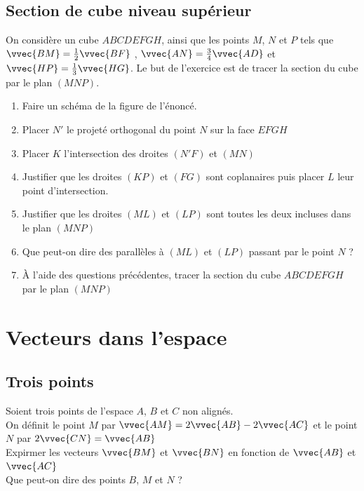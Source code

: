 \documentclass[oneside,12pt]{book}          %
\begin{document}
\subsection{Section de cube niveau supérieur}
On considère un cube $ABCDEFGH$, ainsi que les points $M$, $N$ et $P$ tels que $\vvec{BM}=\frac{1}{2}\vvec{BF}$ , $\vvec{AN}=\frac{3}{4}\vvec{AD}$ et $\vvec{HP}=\frac{1}{3}\vvec{HG}$. Le but de l'exercice est de tracer la section du cube par le plan $(MNP)$.
\begin{enumerate}
    \item Faire un schéma de la figure de l'énoncé.
    \item Placer $N'$ le projeté orthogonal du point $N$ sur la face $EFGH$
    \item Placer $K$ l'intersection des droites $(N'F)$ et $(MN)$
    \item Justifier que les droites $(KP)$ et $(FG)$ sont coplanaires puis placer $L$ leur point d'intersection.
    \item Justifier que les droites $(ML)$ et $(LP)$ sont toutes les deux incluses dans le plan $(MNP)$
    \item Que peut-on dire des parallèles à $(ML)$ et $(LP)$ passant par le point $N$ ?
    \item À l'aide des questions précédentes, tracer la section du cube $ABCDEFGH$ par le plan $(MNP)$
\end{enumerate}



\section{Vecteurs dans l'espace}

\subsection{Trois points}
Soient trois points de l'espace $A$, $B$ et $C$ non alignés.\\
On définit le point $M$ par $\vvec{AM}=2\vvec{AB}-2\vvec{AC}$ et le point $N$ par $2\vvec{CN}=\vvec{AB}$\\
Expirmer les vecteurs $\vvec{BM}$ et $\vvec{BN}$ en fonction de $\vvec{AB}$ et $\vvec{AC}$\\
Que peut-on dire des points $B$, $M$ et $N$ ?
\end{document}
